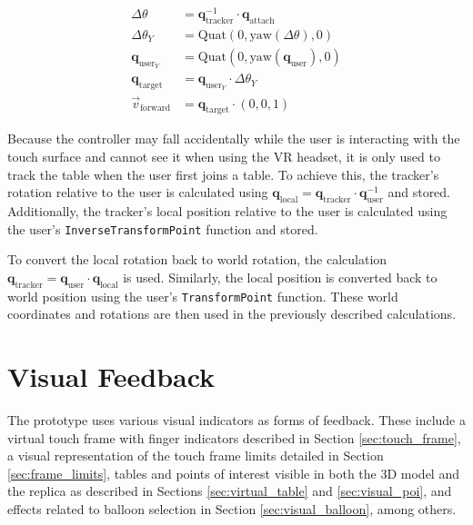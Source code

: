     \begin{figure}[h]
    \begin{equation}
    \begin{split} \label{eq:tracker}
        \Delta\theta&=\mathbf{q}_{\mathrm{tracker}}^{-1}\cdot \mathbf{q}_{\mathrm{attach}} \\
        \Delta\theta_Y &= \mathrm{Quat}(0, \mathrm{yaw}(\Delta\theta), 0) \\
        \mathbf{q}_{\mathrm{user}_Y} &= \mathrm{Quat}(0, \mathrm{yaw}(\mathbf{q}_{\mathrm{user}}), 0) \\
        \mathbf{q}_{\mathrm{target}} &= \mathbf{q}_{\mathrm{user}_Y} \cdot \Delta\theta_Y \\
        \vec{v}_{\mathrm{forward}} &= \mathbf{q}_{\mathrm{target}} \cdot (0,0,1)
    \end{split}
    \end{equation}
    \end{figure}

    Because the controller may fall accidentally while the user is interacting with the touch surface and cannot see it when using the VR headset, it is only used to track the table when the user first joins a table. To achieve this, the tracker's rotation relative to the user is calculated using $\mathbf{q}_{\mathrm{local}} = \mathbf{q}_{\mathrm{tracker}} \cdot \mathbf{q}_{\mathrm{user}}^{-1}$ and stored. Additionally, the tracker's local position relative to the user is calculated using the user's \lstinline{InverseTransformPoint} function and stored.

    To convert the local rotation back to world rotation, the calculation  $\mathbf{q}_{\mathrm{tracker}} = \mathbf{q}_{\mathrm{user}} \cdot \mathbf{q}_{\mathrm{local}}$ is used. Similarly, the local position is converted back to world position using the user's \lstinline{TransformPoint} function. These world coordinates and rotations are then used in the previously described calculations.

\section{Visual Feedback}

    The prototype uses various visual indicators as forms of feedback. These include a virtual touch frame with finger indicators described in Section \ref{sec:touch_frame}, a visual representation of the touch frame limits detailed in Section \ref{sec:frame_limits}, tables and points of interest visible in both the 3D model and the replica as described in Sections \ref{sec:virtual_table} and \ref{sec:visual_poi}, and effects related to balloon selection in Section \ref{sec:visual_balloon}, among others.

